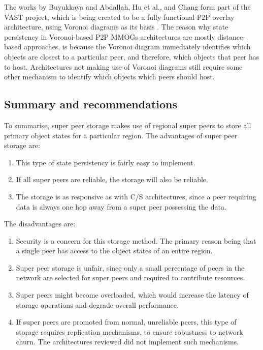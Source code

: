 \documentclass[10pt,a4paper,journal,cspaper,compsoc]{IEEEtran}
\begin{document}
The works by Buyukkaya and Abdallah, Hu et al., and Chang form part of the VAST project, which is being created to be a fully functional P2P overlay
architecture, using Voronoi diagrams as its basis \cite{VAST}. The reason why state persistency in Voronoi-based P2P MMOGs architectures are mostly
distance-based approaches, is because the Voronoi diagram immediately identifies which objects are closest to a particular peer, and therefore, which
objects that peer has to host. Architectures not making use of Voronoi diagrams still require some other mechanism to identify which objects which
peers should host.

\subsection{Summary and recommendations}

To summarise, super peer storage makes use of regional super peers to store all primary object states for a particular region. The advantages of
super peer storage are:
%
\begin{enumerate}
    \item This type of state persistency is fairly easy to implement.
    \item If all super peers are reliable, the storage will also be reliable.
    \item The storage is as responsive as with C/S architectures, since a peer requiring data is always one hop away from a super peer possessing
        the data.
\end{enumerate}

The disadvantages are:
%
\begin{enumerate}
    \item Security is a concern for this storage method. The primary reason being that a single peer has access to the object states of an entire
        region.
    \item Super peer storage is unfair, since only a small percentage of peers in the network are selected for super peers and required to
        contribute resources.
    \item Super peers might become overloaded, which would increase the latency of storage operations and degrade overall performance.
    \item If super peers are promoted from normal, unreliable peers, this type of storage requires replication mechanisms, to ensure robustness
        to network churn. The architectures reviewed did not implement such mechanisms.
\end{enumerate}
\end{document}
